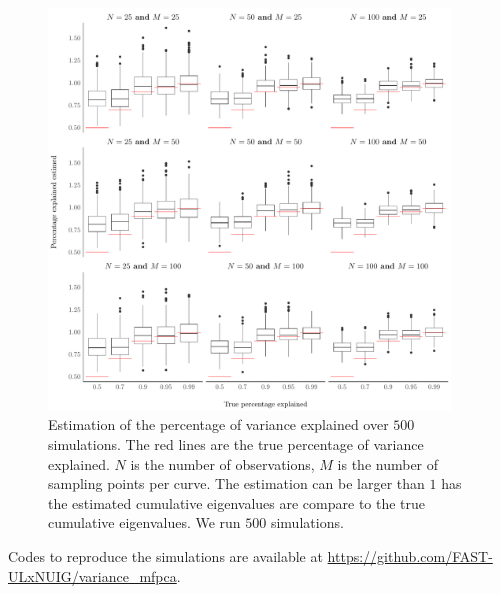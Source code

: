 \begin{figure}
     \centering
    \includegraphics[width=0.95\textwidth]{figures/pct_estim.pdf}
    \caption{Estimation of the percentage of variance explained over $500$ simulations. The red lines are the true percentage of variance explained. $N$ is the number of observations, $M$ is the number of sampling points per curve. The estimation can be larger than $1$ has the estimated cumulative eigenvalues are compare to the true cumulative eigenvalues. We run $500$ simulations.}
    \label{fig:pct_estim}
\end{figure}


Codes to reproduce the simulations are available at \url{https://github.com/FAST-ULxNUIG/variance_mfpca}.